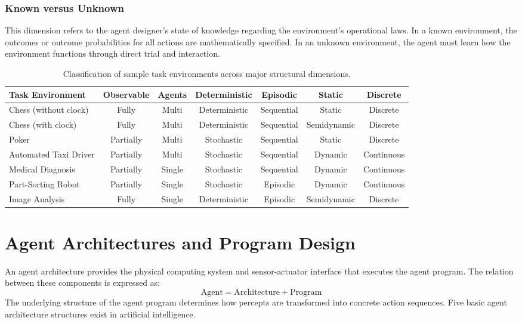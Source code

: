\documentclass[12pt]{report}
\begin{document}
\subsubsection{Known versus Unknown}
This dimension refers to the agent designer's state of knowledge regarding the environment's operational laws. In a known environment, the outcomes or outcome probabilities for all actions are mathematically specified. In an unknown environment, the agent must learn how the environment functions through direct trial and interaction.

\begin{table}[htbp]
\centering
\small
\begin{tabularx}{\textwidth}{@{} X c c c c c c @{}}
\toprule
\textbf{Task Environment} & \textbf{Observable} & \textbf{Agents} & \textbf{Deterministic} & \textbf{Episodic} & \textbf{Static} & \textbf{Discrete} \\
\midrule
Chess (without clock) & Fully & Multi & Deterministic & Sequential & Static & Discrete \\
Chess (with clock) & Fully & Multi & Deterministic & Sequential & Semidynamic & Discrete \\
Poker & Partially & Multi & Stochastic & Sequential & Static & Discrete \\
Automated Taxi Driver & Partially & Multi & Stochastic & Sequential & Dynamic & Continuous \\
Medical Diagnosis & Partially & Single & Stochastic & Sequential & Dynamic & Continuous \\
Part-Sorting Robot & Partially & Single & Stochastic & Episodic & Dynamic & Continuous \\
Image Analysis & Fully & Single & Deterministic & Episodic & Semidynamic & Discrete \\
\bottomrule
\end{tabularx}
\caption{Classification of sample task environments across major structural dimensions.}
\label{tab:env_properties}
\end{table}

\section{Agent Architectures and Program Design}

An agent architecture provides the physical computing system and sensor-actuator interface that executes the agent program. The relation between these components is expressed as:
\begin{equation}
\text{Agent} = \text{Architecture} + \text{Program}
\end{equation}
The underlying structure of the agent program determines how percepts are transformed into concrete action sequences. Five basic agent architecture structures exist in artificial intelligence.
\end{document}
